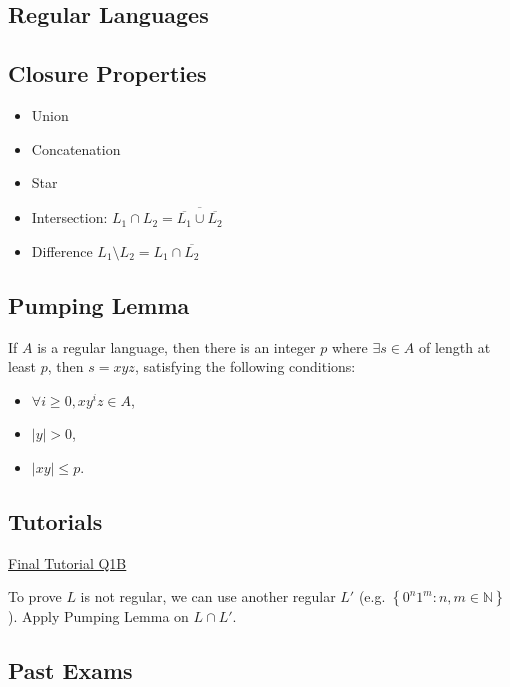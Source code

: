 \documentclass[10pt,landscape,a4paper]{article}
\newcommand{\N}{\mathbb{N}}
\newcommand{\set}[1]{\left \{ #1 \right \}}
\newcommand{\abs}[1]{\left | #1 \right |}
\begin{document}
\begin{multicols*}{3}

\section{Regular Languages}

\subsection{Closure Properties}

\begin{itemize}
    \item Union
    \item Concatenation
    \item Star
    \item Intersection: $L_1 \cap L_2 = \overline{\overline{L_1} \cup \overline{L_2}}$
    \item Difference $L_1 \setminus L_2 = L_1 \cap \overline{L_2}$
\end{itemize}

\subsection{Pumping Lemma}

If $A$ is a regular language, then there is an integer $p$ where $\exists s \in A$ of length at least $p$, then $s = xyz$, satisfying the following conditions:

\begin{itemize}
    \item $\forall i \geq 0, xy^iz \in A$,
    \item $\abs{y} > 0$,
    \item $\abs{xy} \leq p$.
\end{itemize}

\subsection{Tutorials}

\underline{Final Tutorial Q1B}

To prove $L$ is not regular, we can use another regular $L'$ (e.g. $\set{0^n1^m: n, m \in \N}$). Apply Pumping Lemma on $L \cap L'$.

\subsection{Past Exams}


\end{multicols*}
\end{document}
